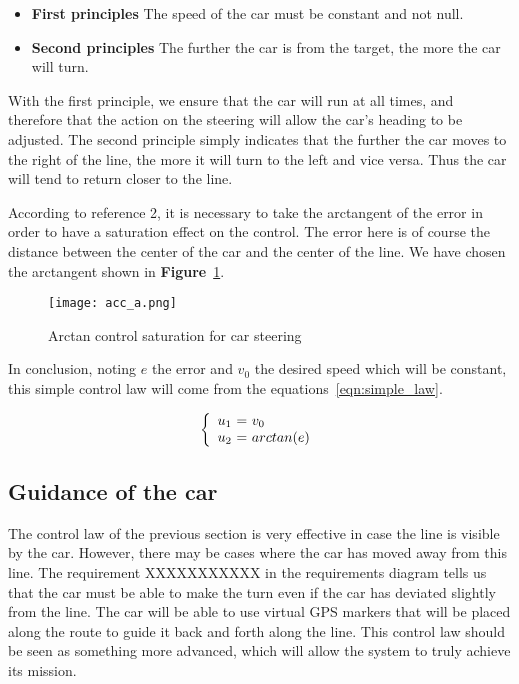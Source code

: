 \begin{itemize}
    \item \textbf{First principles} The speed of the car must be constant and not null.
    \item \textbf{Second principles} The further the car is from the target, the more the car will turn.
\end{itemize}

With the first principle, we ensure that the car will run at all times, and therefore that
the action on the steering will allow the car's heading to be adjusted. The second principle
simply indicates that the further the car moves to the right of the line, the more it will 
turn to the left and vice versa. Thus the car will tend to return closer to the line.

According to reference 2, it is necessary to take the arctangent of the error in order to
have a saturation effect on the control. The error here is of course the distance between
the center of the car and the center of the line. We have chosen the arctangent shown in
\textbf{Figure}~\ref{fig:arctan}.

\begin{figure}[!ht]
    \begin{center}
        \texttt{[image: acc\_a.png]}
    \end{center}
    \caption{Arctan control saturation for car steering}
    \label{fig:arctan}
\end{figure}

In conclusion, noting $e$ the error and $v_0$ the desired speed which will be constant,
this simple control law will come from the equations~\ref{eqn:simple_law}.

\begin{equation}
    \label{eqn:simple_law}
    \left\{
        \begin{array}{c @{=} l}
            u_1\ & \ v_0 \\
            u_2\ & \ arctan(e)
        \end{array}
    \right. 
\end{equation}

\subsection{Guidance of the car}
The control law of the previous section is very effective in case the line is visible
by the car. However, there may be cases where the car has moved away from this line.
The requirement XXXXXXXXXXX in the requirements diagram tells us that the car must be
able to make the turn even if the car has deviated slightly from the line. The car will
be able to use virtual GPS markers that will be placed along the route to guide it back
and forth along the line. This control law should be seen as something more advanced,
which will allow the system to truly achieve its mission.

\newpage